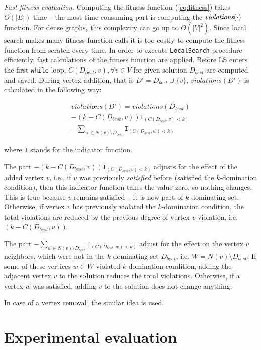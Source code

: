 \documentclass[dvipsnames,format=sigconf,anonymous=true,review=true]{acmart}
\begin{document}
\emph{Fast fitness evaluation}. Computing the fitness function (\ref{eq:fitness}) takes $O(|E|)$ time -- the most time consuming part is computing the $\emph{violations}(\cdot)$  function. For dense graphs, this complexity can go up to $O(|V|^2)$. Since local search makes many fitness function calls it is too costly to compute the fitness function from scratch every time. In order to execute \texttt{LocalSearch} procedure  efficiently, fast calculations of the fitness function are applied. Before LS enters the first \texttt{while} loop, $C(D_{best}, v), \forall v \in V$ for given solution $D_{best}$ are computed and saved. During vertex addition, that is  $D' = D_{best} \cup \{v\} $, $violations(D')$ is calculated in the following way: 

\begin{multline}
violations(D') = violations(D_{best}) \\
- (k-C(D_{best}, v))  \texttt{I}_{(C(D_{best},v)<k)}  \\ 
- \sum_{w\in N(v) \setminus D_{best}} \texttt{I}_{(C(D_{best}, w)<k)}
\end{multline}

where \texttt{I} stands for the indicator function. 

The part $-(k- C(D_{best}, v)) \texttt{I}_{(C(D_{best},v)<k)}$ adjusts for the effect of the added vertex $v$, i.e., if $v$ was previously \emph{satisfied} before (satisfied the $k$-domination condition), then this indicator function takes the value zero, so nothing changes. This is true because $v$ remains satisfied -- it is now part of $k$-dominating set. 
Otherwise, if vertex $v$ has previously violated the $k$-domination condition, the total violations are reduced by the previous degree of vertex $v$ violation, i.e. $(k- C(D_{best}, v))$.

The part $- \sum_{w\in N(v) \setminus D_{best}} \texttt{I}_{(C(D_{best}, w)<k)}$ adjust for the effect on the vertex $v$ neighbors, which were not in the $k$-dominating set $D_{best}$, i.e. $W=N(v) \setminus D_{best}$. If some of these vertices $w \in W$ violated $k$-domination condition, adding the adjacent vertex $v$ to the solution reduces the total violations. Otherwise, if a vertex $w$ was satisfied, adding $v$ to the solution does not change anything.  
 
In case of a vertex removal, the similar idea is used. 


\section{Experimental evaluation}\label{sec:experiments}
\end{document}
